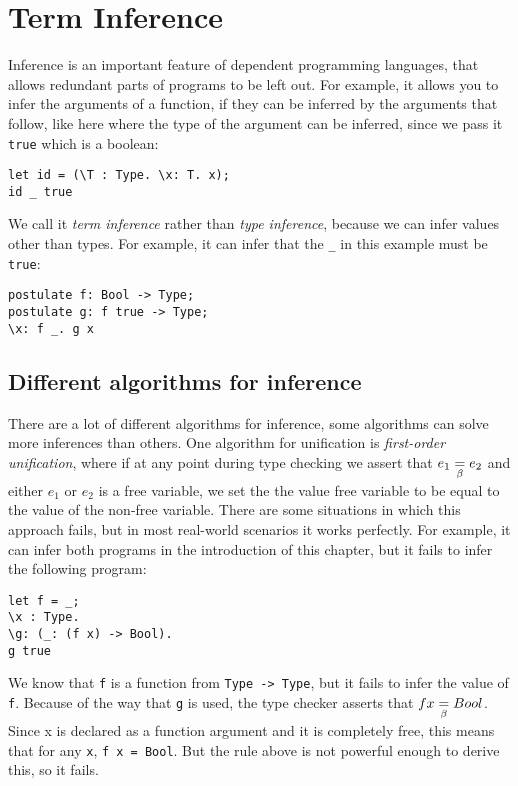 \chapter{Term Inference}
\label{ch:inference}

Inference is an important feature of dependent programming languages, that allows redundant parts of programs to be left out. For example, it allows you to infer the arguments of a function, if they can be inferred by the arguments that follow, like here where the type of the argument can be inferred, since we pass it \verb|true| which is a boolean:
\begin{lstlisting}
let id = (\T : Type. \x: T. x);
id _ true
\end{lstlisting}

We call it \emph{term inference} rather than \emph{type inference}, because we can infer values other than types. For example, it can infer that the \verb|_| in this example must be \verb|true|:
\begin{lstlisting}
postulate f: Bool -> Type;
postulate g: f true -> Type;
\x: f _. g x
\end{lstlisting}

\section{Different algorithms for inference}
\label{strength-inference}

There are a lot of different algorithms for inference\cite{typeinference}, some algorithms can solve more inferences than others. One algorithm for unification is \emph{first-order unification}, where if at any point during type checking we assert that $e_1 \underset{\beta}{=} e_2$ and either $e_1$ or $e_2$ is a free variable, we set the the value free variable to be equal to the value of the non-free variable. There are some situations in which this approach fails, but in most real-world scenarios it works perfectly. For example, it can infer both programs in the introduction of this chapter, but it fails to infer the following program:

\begin{lstlisting}
let f = _;
\x : Type.
\g: (_: (f x) -> Bool).
g true
\end{lstlisting}

We know that \verb|f| is a function from \verb|Type -> Type|, but it fails to infer the value of \verb|f|. Because of the way that \verb|g| is used, the type checker asserts that $f x \underset{\beta}{=} Bool$. Since x is declared as a function argument and it is completely free, this means that for any \verb|x|, \verb|f x = Bool|. But the rule above is not powerful enough to derive this, so it fails.

